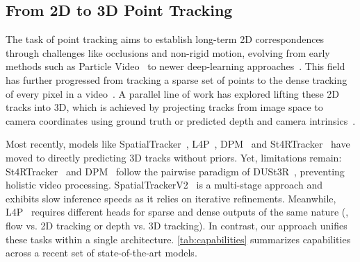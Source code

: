 


\subsection{From 2D to 3D Point Tracking}
\label{sec:related:tracking}

The task of point tracking aims to establish long-term 2D correspondences through challenges like occlusions and non-rigid motion, evolving from early methods such as Particle Video~\cite{sand2008particle} to newer deep-learning approaches~\cite{harley2022particle, doersch2022tap, doersch2023tapir, zholus2025tapnext}.
This field has further progressed from tracking a sparse set of points to the dense tracking of every pixel in a video~\cite{le2024dot, ngo2024delta, harley2025alltracker}.
A parallel line of work has explored lifting these 2D tracks into 3D, which is achieved by projecting tracks from image space to camera coordinates using ground truth or predicted depth and camera intrinsics~\cite{koppula2024tapvid}.




Most recently, models like SpatialTracker~\cite{xiao2024spatialtracker, xiao2025spatialtrackerv2}, L4P~\cite{badki2026l4p}, DPM~\cite{sucar2025dynamic} and St4RTracker~\cite{feng2025st4rtrack} have moved to directly predicting 3D tracks without priors. Yet, limitations remain: St4RTracker~\cite{feng2025st4rtrack} and DPM~\cite{sucar2025dynamic} follow the pairwise paradigm of DUSt3R~\cite{wang2024dust3r}, preventing holistic video processing. SpatialTrackerV2~\cite{xiao2025spatialtrackerv2} is a multi-stage approach and exhibits slow inference speeds as it relies on iterative refinements. Meanwhile, L4P~\cite{badki2026l4p} requires different heads for sparse and dense outputs of the same nature (\eg, flow vs. 2D tracking or depth vs. 3D tracking). In contrast, our approach unifies these tasks within a single architecture.
\cref{tab:capabilities} summarizes capabilities across a recent set of state-of-the-art models.

